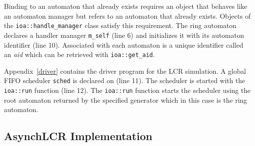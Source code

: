 Binding to an automaton that already exists requires an object that behaves like an automaton manager but refers to an automaton that already exists.
Objects of the \verb+ioa::handle_manager+ class satisfy this requirement.
The ring automaton declares a handler manager \verb+m_self+ (line 6) and initializes it with its automaton identifier (line 10).
Associated with each automaton is a unique identifier called an \emph{aid} which can be retrieved with \verb+ioa::get_aid+.

Appendix~\ref{driver} contains the driver program for the LCR simulation.
A global FIFO scheduler \verb+sched+ is declared on (line 11).
The scheduler is started with the \verb+ioa::run+ function (line 12).
The \verb+ioa::run+ function starts the scheduler using the root automaton returned by the specified generator which in this case is the ring automaton.

\subsection{AsynchLCR Implementation}



